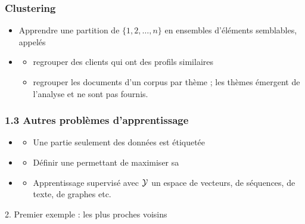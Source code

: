 \begin{frame}
  \frametitle{Clustering}
  \begin{itemize}
  \item[] Apprendre une partition de $\{1, 2, \dots, n\}$ en ensembles
    d'éléments semblables, appelés 
  \item {}
    \begin{itemize}
    \item {} regrouper des clients qui ont des
      profils similaires
    \item {} regrouper les documents d'un corpus par
      thème ; les thèmes émergent de l'analyse et ne sont pas fournis. %
    \end{itemize}
  \end{itemize}
\end{frame}


  \begin{frame}
  \frametitle{1.3 Autres problèmes d'apprentissage}
  
  \begin{itemize}
  \item {}
    \begin{itemize}
    \item[] Une partie seulement des données est étiquetée
    \end{itemize}
  \item {}
    \begin{itemize}
    \item[] Définir une  permettant de maximiser sa  
    \end{itemize}
  \item {}
    \begin{itemize}
    \item[] Apprentissage supervisé avec $\mathcal{Y}$ un espace de vecteurs, de
      séquences, de texte, de graphes etc.
    \end{itemize}
  \end{itemize}
\end{frame}

\begin{frame}
  \begin{center}
    \large{2. Premier exemple : les plus proches voisins}
  \end{center}
\end{frame}

